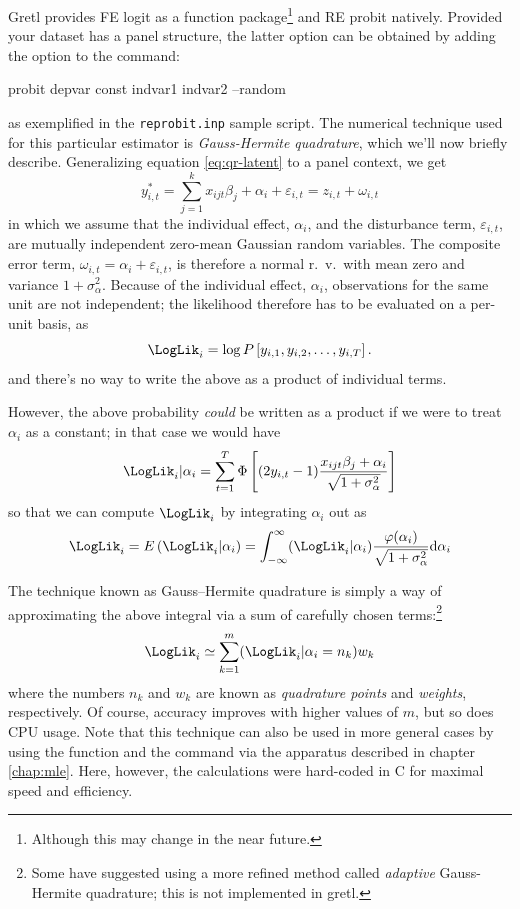 Gretl provides FE logit as a function package\footnote{Although this
  may change in the near future.} and RE probit natively. Provided
your dataset has a panel structure, the latter option can be obtained
by adding the  option to the  command:
\begin{code}
  probit depvar const indvar1 indvar2 --random
\end{code}
as exemplified in the \texttt{reprobit.inp} sample script. The
numerical technique used for this particular estimator is
\emph{Gauss-Hermite quadrature}, which we'll now briefly
describe. Generalizing equation \eqref{eq:qr-latent} to a panel
context, we get
\begin{equation}
  y^*_{i,t} = \sum_{j=1}^k x_{ijt} \beta_j + \alpha_i + \varepsilon_{i,t} = z_{i,t}  +
  \omega_{i,t} 
\end{equation}
in which we assume that the individual effect, $\alpha_i$, and the
disturbance term, $\varepsilon_{i,t}$, are mutually independent
zero-mean Gaussian random variables. The composite error term,
$\omega_{i,t} = \alpha_i + \varepsilon_{i,t}$, is therefore a normal
r.~v.~with mean zero and variance $1 + \sigma^2_{\alpha}$. Because of
the individual effect, $\alpha_i$, observations for the same unit are
not independent; the likelihood therefore has to be evaluated on a
per-unit basis, as
\[
\LogLik_i = \log P\left[ y_{i,1}, y_{i,2}, \ldots , y_{i,T}\right] .
\]
and there's no way to write the above as a product of individual
terms.

However, the above probability \emph{could} be written as a product if
we were to treat $\alpha_i$ as a constant; in that case we would have
\[
\LogLik_i | \alpha_i = \sum_{t=1}^T 
\Phi\left[ 
(2 y_{i,t} - 1) \frac{x_{ijt} \beta_j + \alpha_i}{\sqrt{1 + \sigma^2_{\alpha}}}
\right]
\]
so that we can compute $\LogLik_i$ by integrating $\alpha_i$ out as
\[
\LogLik_i = E\left( \LogLik_i | \alpha_i \right) =
\int_{-\infty}^{\infty} (\LogLik_i | \alpha_i)
\frac{\varphi(\alpha_i)}{\sqrt{1 + \sigma^2_{\alpha}}} \mathrm{d} \alpha_i 
\]

The technique known as Gauss--Hermite quadrature is simply a way of
approximating the above integral via a sum of carefully chosen
terms:\footnote{Some have suggested using a more refined method called
  \emph{adaptive} Gauss-Hermite quadrature; this is not implemented in
  gretl.}
\[
\LogLik_i \simeq \sum_{k=1}^{m} (\LogLik_i | \alpha_i = n_k ) w_k
\]
where the numbers $n_k$ and $w_k$ are known as \emph{quadrature
  points} and \emph{weights}, respectively. Of course, accuracy
improves with higher values of $m$, but so does CPU usage. Note that
this technique can also be used in more general cases by using the
 function and the  command via the apparatus
described in chapter \ref{chap:mle}. Here, however, the calculations
were hard-coded in C for maximal speed and efficiency.

